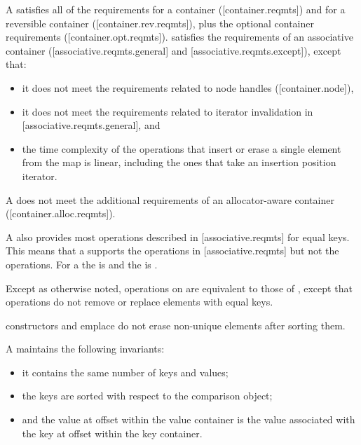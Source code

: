 \begin{addedblock}
\pnum
A  satisfies all of the requirements for a container
([container.reqmts]) and for a reversible container ([container.rev.reqmts]),
plus the optional container requirements ([container.opt.reqmts]).  
satisfies the requirements of an associative container ([associative.reqmts.general] and
[associative.reqmts.except]), except that:
\begin{itemize}
\item it does not meet the requirements related to node handles ([container.node]),
\item it does not meet the requirements related to iterator invalidation in [associative.reqmts.general], and
\item the time complexity of the operations that insert or erase a single
element from the map is linear, including the ones that take an insertion
position iterator.
\end{itemize}
\begin{note}A  does not meet the additional requirements of an
allocator-aware container ([container.alloc.reqmts]).\end{note}

\pnum
A  also provides most operations described
in [associative.reqmts] for equal keys.  This means that a
 supports the  operations
in [associative.reqmts] but not the  operations.  For
a  the  is  and the
 is .

\pnum
Except as otherwise noted, operations on  are equivalent
to those of , except that  operations do
not remove or replace elements with equal keys.  \begin{example}
constructors and emplace do not erase non-unique elements after sorting them.\end{example}

\pnum
A  maintains the following invariants:
\begin{itemize}
\item it contains the same number of keys and values;
\item the keys are sorted with respect to the comparison object;
\item and the value at offset  within the value container is the value associated with the key at offset  within the key container.
\end{itemize}


\end{addedblock}
